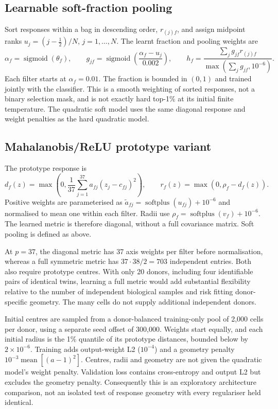 \documentclass[11pt,a4paper]{article}
\begin{document}
\subsection{Learnable soft-fraction pooling}
Sort responses within a bag in descending order, $r_{(j)f}$, and assign midpoint ranks $u_j=(j-\tfrac12)/N$, $j=1,\ldots,N$. The learnt fraction and pooling weights are
\[
\alpha_f=\operatorname{sigmoid}(\theta_f),\qquad
g_{jf}=\operatorname{sigmoid}\left(\frac{\alpha_f-u_j}{0.002}\right),\qquad
h_f=\frac{\sum_jg_{jf}r_{(j)f}}{\max(\sum_jg_{jf},10^{-6})}.
\]
Each filter starts at $\alpha_f=0.01$. The fraction is bounded in $(0,1)$ and trained jointly with the classifier. This is a smooth weighting of sorted responses, not a binary selection mask, and is not exactly hard top-1\% at its initial finite temperature. The quadratic soft model uses the same diagonal response and weight penalties as the hard quadratic model.

\subsection{Mahalanobis/ReLU prototype variant}
The prototype response is
\[
d_f(z)=\max\left(0,\frac1{37}\sum_{j=1}^{37}a_{fj}(z_j-c_{fj})^2\right),
\qquad r_f(z)=\max(0,\rho_f-d_f(z)).
\]
Positive weights are parameterised as $\tilde a_{fj}=\operatorname{softplus}(u_{fj})+10^{-6}$ and normalised to mean one within each filter. Radii use $\rho_f=\operatorname{softplus}(v_f)+10^{-6}$. The learned metric is therefore diagonal, without a full covariance matrix. Soft pooling is defined as above.

At $p=37$, the diagonal metric has 37 axis weights per filter before normalisation, whereas a full symmetric metric has $37\cdot38/2=703$ independent entries. Both also require prototype centres. With only 20 donors, including four identifiable pairs of identical twins, learning a full metric would add substantial flexibility relative to the number of independent biological samples and risk fitting donor-specific geometry. The many cells do not supply additional independent donors.

Initial centres are sampled from a donor-balanced training-only pool of 2,000 cells per donor, using a separate seed offset of 300,000. Weights start equally, and each initial radius is the 1\% quantile of its prototype distances, bounded below by $2\times10^{-6}$. Training adds output-weight L2 ($10^{-4}$) and a geometry penalty $10^{-3}\operatorname{mean}[(a-1)^2]$. Centres, radii and geometry are not given the quadratic model's weight penalty. Validation loss contains cross-entropy and output L2 but excludes the geometry penalty. Consequently this is an exploratory architecture comparison, not an isolated test of response geometry with every regulariser held identical.
\end{document}
